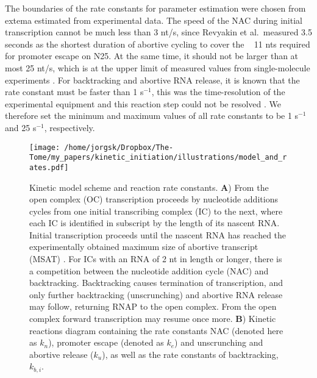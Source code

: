 The boundaries of the rate constants for parameter estimation were chosen from
extema estimated from experimental data. The speed of the NAC during initial
transcription cannot be much less than 3 nt/s, since Revyakin et al.\ measured
3.5 seconds as the shortest duration of abortive cycling
\cite{revyakin_abortive_2006} to cover the ~ 11 nts required for promoter
escape on N25. At the same time, it should not be larger than at most 25 nt/s,
which is at the upper limit of measured values from single-molecule
experiments \cite{bai_mechanochemical_2007}. For backtracking and abortive RNA
release, it is known that the rate constant must be faster than 1 s$^{-1}$,
this was the time-resolution of the experimental equipment and this reaction
step could not be resolved \cite{revyakin_abortive_2006}. We therefore set the
minimum and maximum values of all rate constants to be 1 s$^{-1}$ and 25
s$^{-1}$, respectively. 

\begin{figure}
	\begin{center}
        \texttt{[image: /home/jorgsk/Dropbox/The-Tome/my\_papers/kinetic\_initiation/illustrations/model\_and\_rates.pdf]}
	\end{center}
    \caption{Kinetic model scheme and reaction rate constants. \textbf{A})
    From the open complex (OC) transcription proceeds by nucleotide additions
    cycles from one initial transcribing complex (IC) to the next, where each
    IC is identified in subscript by the length of its nascent RNA. Initial
    transcription proceeds until the nascent RNA has reached the
    experimentally obtained maximum size of abortive transcript (MSAT)
    \cite{hsu_initial_2006}. For ICs with an RNA of 2 nt in length or longer, there is a
    competition between the nucleotide addition cycle (NAC) and backtracking.
    Backtracking causes termination of transcription, and only further
    backtracking (unscrunching) and abortive RNA release may follow, returning
    RNAP to the open complex. From the open complex forward transcription may
    resume once more. \textbf{B}) Kinetic reactions diagram containing the
    rate constants NAC (denoted here as $k_n$), promoter escape (denoted as
    $k_e$) and unscrunching and abortive release ($k_u$), as well as the rate
    constants of backtracking, $k_{b,i}$.}
    \label{fig:model_and_rates}
\end{figure}
